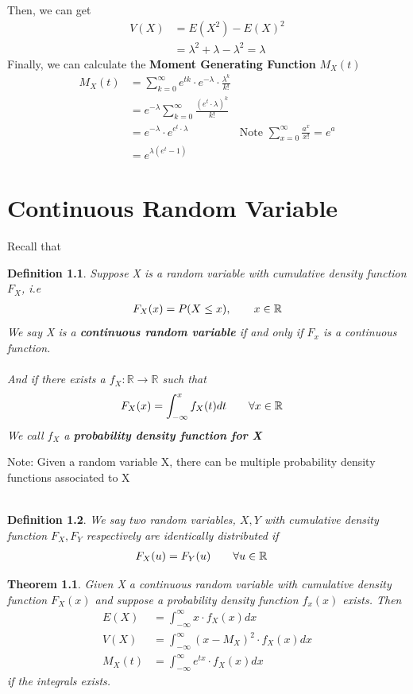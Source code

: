 \documentclass[11pt,oneside]{book}
\theoremstyle{break}
\theoremstyle{break}
\newtheorem{thm}{Theorem}[section]
\newtheorem{defn}{Definition}[corL]
\newcommand{\note}{\color{Purple}Note: \color{black}}
\begin{document}
Then, we can get
\begin{align*}
V(X)&=E(X^2)-E(X)^2\\
&=\lambda^2+\lambda-\lambda^2=\lambda
\end{align*}
Finally, we can calculate the \textbf{Moment Generating Function} $M_X(t)$\begin{align*}
M_X(t)&=\sum_{k=0}^{\infty}e^{tk}\cdot e^{-\lambda}\cdot\frac{\lambda^k}{k!}\\
&=e^{-\lambda}\sum_{k=0}^{\infty}\frac{(e^t\cdot \lambda)^k}{k!}\\
&=e^{-\lambda}\cdot e^{e^t\cdot \lambda} &\text{Note }\sum_{x=0}^{\infty}\frac{a^x}{x!}=e^a\\
&=e^{\lambda(e^t-1)}
\end{align*}
\chapter[Continuous Random Variable]{Continuous Random Variable}
Recall that \begin{defn}
Suppose X is a random variable with cumulative density function $F_X$, i.e\begin{align*}
F_X(x)=P(X\leq x),\text{\qquad}x\in \mathbb{R}
\end{align*}
We say X is a \textbf{continuous random variable} if and only if $F_x$ is a continuous function.\\
\hfill\\
And if there exists a $f_X:\mathbb{R}\rightarrow \mathbb{R}$ such that \begin{align*}
F_X(x)&=\int_{-\infty}^{x}f_X(t)dt\text{\qquad}\forall x\in \mathbb{R}
\end{align*}
We call $f_X$ a \textbf{probability density function for X}
\end{defn}
\note Given a random variable X, there can be multiple probability density functions associated to X\\
\hfill\\
\begin{defn}
We say two random variables, $X,Y$ with cumulative density function $F_X,F_Y$ respectively are identically distributed if \begin{align*}
F_X(u)&=F_Y(u)\text{\qquad} \forall u\in \mathbb{R}
\end{align*}
\end{defn}
\begin{thm}
Given X a continuous random variable with cumulative density function $F_X(x)$ and suppose a probability density function $f_x(x)$ exists. Then \begin{align*}
E(X)&=\int_{-\infty}^{\infty}x\cdot f_X(x)dx\\
V(X)&=\int_{-\infty}^{\infty}(x-M_X)^2\cdot f_X(x)dx\\
M_X(t)&=\int_{-\infty}^{\infty}e^{tx}\cdot f_X(x)dx
\end{align*}
if the integrals exists.
\end{thm}
\end{document}
